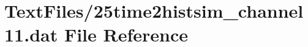 \hypertarget{25time2histsim__channel11_8dat}{}\section{Text\+Files/25time2histsim\+\_\+channel11.dat File Reference}
\label{25time2histsim__channel11_8dat}
